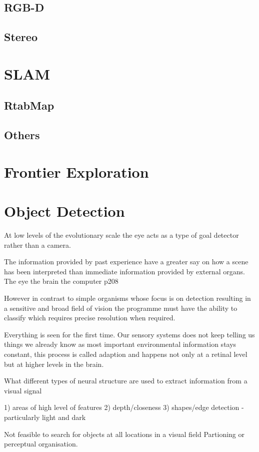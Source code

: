 \documentclass{mproj}
\begin{document}
\subsection{RGB-D}
\subsection{Stereo}
\section{SLAM}
\subsection{RtabMap}
\subsection{Others}
\section{Frontier Exploration}
\section{Object Detection}

At low levels of the evolutionary scale the eye acts as a type of goal detector rather than a camera. 

The information provided by past experience have a greater say on how a scene has been interpreted than immediate information provided by external organs.
The eye the brain the computer p208

However in contrast to simple organisms whose focus is on detection resulting in a sensitive and broad field of vision the programme must have the ability to classify which requires precise resolution when required.

Everything is seen for the first time.
Our sensory systems does not keep telling us things we already know as most important environmental information stays constant, this process is called adaption and happens not only at a retinal level but at higher levels in the brain.

What different types of neural structure are used to extract information from a visual signal

1) areas of high level of features
2) depth/closeness
3) shapes/edge detection - particularly light and dark

Not feasible to search for objects at all locations in a visual field
Partioning or perceptual organisation.
\end{document}
